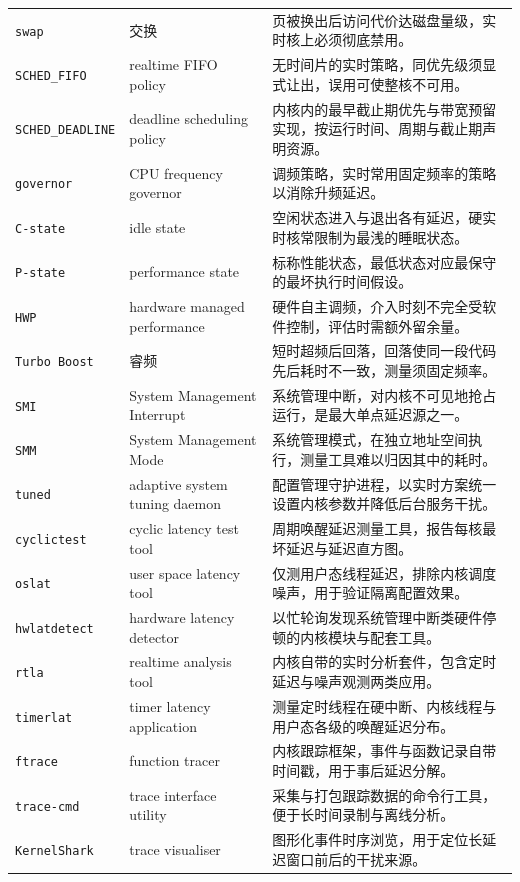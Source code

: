 \documentclass[12pt,a4paper,fontset=fandol]{ctexbook}
\newcommand{\Tp}[1]{\texttt{#1}}
\begin{document}
\begin{longtable}{@{} >{\raggedright\arraybackslash}p{} >{\raggedright\arraybackslash}p{} >{\raggedright\arraybackslash}p{}@{}}
\Tp{swap} & 交换 & 页被换出后访问代价达磁盘量级，实时核上必须彻底禁用。 \\
\Tp{SCHED\_FIFO} & realtime FIFO policy & 无时间片的实时策略，同优先级须显式让出，误用可使整核不可用。 \\
\Tp{SCHED\_DEADLINE} & deadline scheduling policy & 内核内的最早截止期优先与带宽预留实现，按运行时间、周期与截止期声明资源。 \\
\Tp{governor} & CPU frequency governor & 调频策略，实时常用固定频率的策略以消除升频延迟。 \\
\Tp{C-state} & idle state & 空闲状态进入与退出各有延迟，硬实时核常限制为最浅的睡眠状态。 \\
\Tp{P-state} & performance state & 标称性能状态，最低状态对应最保守的最坏执行时间假设。 \\
\Tp{HWP} & hardware managed performance & 硬件自主调频，介入时刻不完全受软件控制，评估时需额外留余量。 \\
\Tp{Turbo Boost} & 睿频 & 短时超频后回落，回落使同一段代码先后耗时不一致，测量须固定频率。 \\
\Tp{SMI} & System Management Interrupt & 系统管理中断，对内核不可见地抢占运行，是最大单点延迟源之一。 \\
\Tp{SMM} & System Management Mode & 系统管理模式，在独立地址空间执行，测量工具难以归因其中的耗时。 \\
\Tp{tuned} & adaptive system tuning daemon & 配置管理守护进程，以实时方案统一设置内核参数并降低后台服务干扰。 \\
\Tp{cyclictest} & cyclic latency test tool & 周期唤醒延迟测量工具，报告每核最坏延迟与延迟直方图。 \\
\Tp{oslat} & user space latency tool & 仅测用户态线程延迟，排除内核调度噪声，用于验证隔离配置效果。 \\
\Tp{hwlatdetect} & hardware latency detector & 以忙轮询发现系统管理中断类硬件停顿的内核模块与配套工具。 \\
\Tp{rtla} & realtime analysis tool & 内核自带的实时分析套件，包含定时延迟与噪声观测两类应用。 \\
\Tp{timerlat} & timer latency application & 测量定时线程在硬中断、内核线程与用户态各级的唤醒延迟分布。 \\
\Tp{ftrace} & function tracer & 内核跟踪框架，事件与函数记录自带时间戳，用于事后延迟分解。 \\
\Tp{trace-cmd} & trace interface utility & 采集与打包跟踪数据的命令行工具，便于长时间录制与离线分析。 \\
\Tp{KernelShark} & trace visualiser & 图形化事件时序浏览，用于定位长延迟窗口前后的干扰来源。 \\

\end{longtable}
\end{document}
